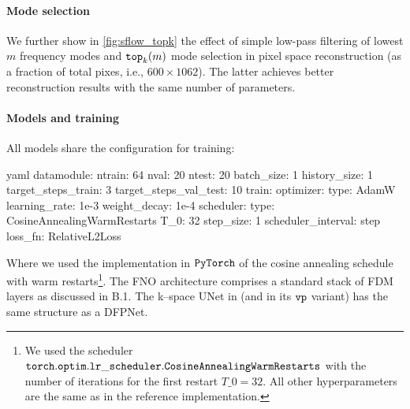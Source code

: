 \paragraph{Mode selection} We further show in \cref{fig:sflow_topk} the effect of simple low-pass filtering of lowest $m$ frequency modes and ${\tt top}_k(m)$ mode selection in pixel space reconstruction (as a fraction of total pixes, i.e., $600 \times 1062$). The latter achieves better reconstruction results with the same number of parameters.




\pagebreak
\paragraph{Models and training}

All models share the configuration for training:

\begin{listing}[H]
\begin{mintedbox}{yaml}
datamodule: 
    ntrain: 64
    nval: 20
    ntest: 20
    batch_size: 1
    history_size: 1
    target_steps_train: 3
    target_steps_val_test: 10
train:
    optimizer: 
        type: AdamW
        learning_rate: 1e-3
        weight_decay: 1e-4
    scheduler:
        type: CosineAnnealingWarmRestarts
        T_0: 32
        step_size: 1
        scheduler_interval: step
loss_fn: RelativeL2Loss
\end{mintedbox}
\vspace{-6mm}
\end{listing}



Where we used the implementation in $\tt PyTorch$ of the cosine annealing schedule with warm restarts\footnote{We used the scheduler \href{https://pytorch.org/docs/stable/generated/torch.optim.lr_scheduler.CosineAnnealingWarmRestarts.html}{$\tt torch.optim.lr\_scheduler.CosineAnnealingWarmRestarts$} with the number of iterations for the first restart $T\_0 = 32$. All other hyperparameters are the same as in the reference implementation.}.
The FNO architecture comprises a standard stack of FDM layers as discussed in B.1. The k–space UNet in \ourmethod{+} (and in its $\tt vp$ variant) has the same structure as a DFPNet.


